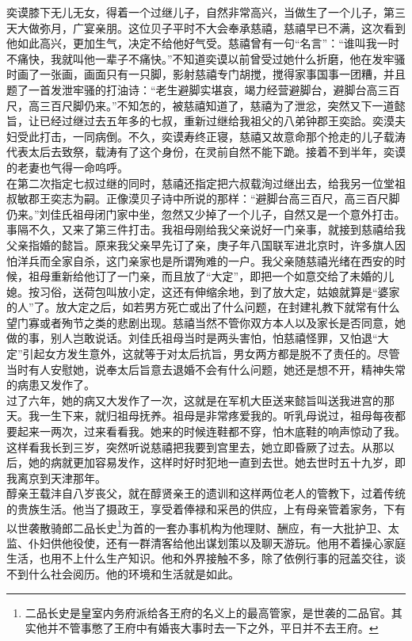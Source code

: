 奕谟膝下无儿无女，得着一个过继儿子，自然非常高兴，当做生了一个儿子，第三天大做弥月，广宴亲朋。这位贝子平时不大会奉承慈禧，慈禧早已不满，这次看到他如此高兴，更加生气，决定不给他好气受。慈禧曾有一句“名言”：“谁叫我一时不痛快，我就叫他一辈子不痛快。”不知道奕谟以前曾受过她什么折磨，他在发牢骚时画了一张画，画面只有一只脚，影射慈禧专门胡搅，搅得家事国事一团糟，并且题了一首发泄牢骚的打油诗：“老生避脚实堪哀，竭力经营避脚台，避脚台高三百尺，高三百尺脚仍来。”不知怎的，被慈禧知道了，慈禧为了泄忿，突然又下一道懿旨，让已经过继过去五年多的七叔，重新过继给我祖父的八弟钟郡王奕詥。奕漠夫妇受此打击，一同病倒。不久，奕谟寿终正寝，慈禧又故意命那个抢走的儿子载涛代表太后去致祭，载涛有了这个身份，在灵前自然不能下跪。接着不到半年，奕谟的老妻也气得一命呜呼。\\

在第二次指定七叔过继的同时，慈禧还指定把六叔载洵过继出去，给我另一位堂祖叔敏郡王奕志为嗣。正像漠贝子诗中所说的那样：“避脚台高三百尺，高三百尺脚仍来。”刘佳氏祖母闭门家中坐，忽然又少掉了一个儿子，自然又是一个意外打击。事隔不久，又来了第三件打击。我祖母刚给我父亲说好一门亲事，就接到慈禧给我父亲指婚的懿旨。原来我父亲早先订了亲，庚子年八国联军进北京时，许多旗人因怕洋兵而全家自杀，这门亲家也是所谓殉难的一户。我父亲随慈禧光绪在西安的时候，祖母重新给他订了一门亲，而且放了“大定”，即把一个如意交给了未婚的儿媳。按习俗，送荷包叫放小定，这还有伸缩余地，到了放大定，姑娘就算是“婆家的人”了。放大定之后，如若男方死亡或出了什么问题，在封建礼教下就常有什么望门寡或者殉节之类的悲剧出现。慈禧当然不管你双方本人以及家长是否同意，她做的事，别人岂敢说话。刘佳氏祖母当时是两头害怕，怕慈禧怪罪，又怕退“大定”引起女方发生意外，这就等于对太后抗旨，男女两方都是脱不了责任的。尽管当时有人安慰她，说奉太后旨意去退婚不会有什么问题，她还是想不开，精神失常的病患又发作了。\\

过了六年，她的病又大发作了一次，这就是在军机大臣送来懿旨叫送我进宫的那天。我一生下来，就归祖母抚养。祖母是非常疼爱我的。听乳母说过，祖母每夜都要起来一两次，过来看看我。她来的时候连鞋都不穿，怕木底鞋的响声惊动了我。这样看我长到三岁，突然听说慈禧把我要到宫里去，她立即昏厥了过去。从那以后，她的病就更加容易发作，这样时好时犯地一直到去世。她去世时五十九岁，即我离京到天津那年。\\

醇亲王载沣自八岁丧父，就在醇贤亲王的遗训和这样两位老人的管教下，过着传统的贵族生活。他当了摄政王，享受着俸禄和采邑的供应，上有母亲管着家务，下有以世袭散骑郎二品长史\footnote{二品长史是皇室内务府派给各王府的名义上的最高管家，是世袭的二品官。其实他并不管事憋了王府中有婚丧大事时去一下之外，平日并不去王府。}为首的一套办事机构为他理财、酬应，有一大批护卫、太监、仆妇供他役使，还有一群清客给他出谋划策以及聊天游玩。他用不着操心家庭生活，也用不上什么生产知识。他和外界接触不多，除了依例行事的冠盖交往，谈不到什么社会阅历。他的环境和生活就是如此。\\


